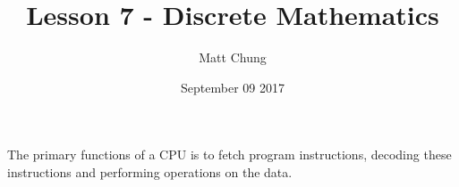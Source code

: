 \documentclass{article}
\title{Lesson 7 - Discrete Mathematics}
\author{Matt Chung}
\date{September 09 2017}
\begin{document}
\maketitle

\section{}
The primary functions of a CPU is to fetch program instructions, decoding these instructions and performing operations on the data.
\end{document}

